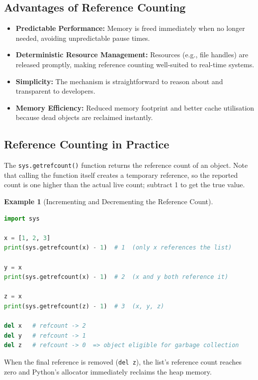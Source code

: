 \documentclass[11pt, a4paper, notitlepage]{report}
\theoremstyle{definition}
\theoremstyle{remark}
\theoremstyle{definition}
\newtheorem{example}[theorem]{Example}
\begin{document}
\subsection{Advantages of Reference Counting}
\label{subsec:refcount-adv}

\begin{itemize}
  \item \textbf{Predictable Performance:} Memory is freed immediately when no longer needed,
        avoiding unpredictable pause times.
  \item \textbf{Deterministic Resource Management:} Resources (e.g., file handles) are
        released promptly, making reference counting well-suited to real-time systems.
  \item \textbf{Simplicity:} The mechanism is straightforward to reason about and transparent
        to developers.
  \item \textbf{Memory Efficiency:} Reduced memory footprint and better cache utilisation
        because dead objects are reclaimed instantly.
\end{itemize}

\subsection{Reference Counting in Practice}
\label{subsec:refcount-example}

The \texttt{sys.getrefcount()} function returns the reference count of an object. Note that
calling the function itself creates a temporary reference, so the reported count is one higher
than the actual live count; subtract 1 to get the true value.

\begin{example}[Incrementing and Decrementing the Reference Count]
\leavevmode
\begin{lstlisting}[language=Python]
import sys

x = [1, 2, 3]
print(sys.getrefcount(x) - 1)  # 1  (only x references the list)

y = x
print(sys.getrefcount(x) - 1)  # 2  (x and y both reference it)

z = x
print(sys.getrefcount(z) - 1)  # 3  (x, y, z)

del x   # refcount -> 2
del y   # refcount -> 1
del z   # refcount -> 0  => object eligible for garbage collection
\end{lstlisting}
When the final reference is removed (\texttt{del z}), the list's reference count reaches zero
and Python's allocator immediately reclaims the heap memory.
\end{example}
\end{document}

